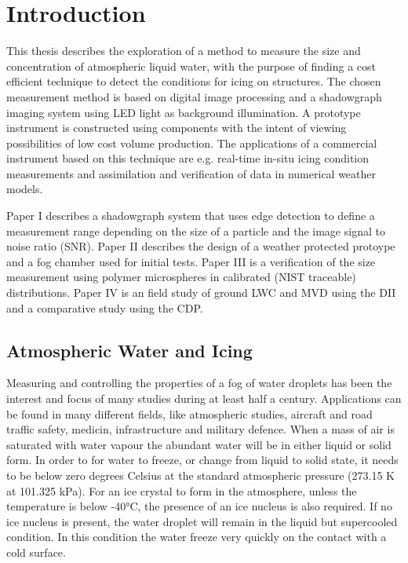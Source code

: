 

\chapter{Introduction}

This thesis describes the exploration of a method to measure the size and concentration of atmospheric liquid water, with the purpose of finding a cost efficient technique to detect the conditions for icing on structures. The chosen measurement method is based on digital image processing and a shadowgraph imaging system using LED light as background illumination. A prototype instrument is constructed using components with the intent of viewing possibilities of low cost volume production. The applications of a commercial instrument based on this technique are e.g. real-time in-situ icing condition measurements and assimilation and verification of data in numerical weather models. 

Paper I describes a shadowgraph system that uses edge detection to define a measurement range depending on the size of a particle and the image signal to noise ratio (SNR). Paper II describes the design of a weather protected protoype and a fog chamber used for initial tests. Paper III is a verification of the size measurement using polymer microspheres in calibrated (NIST traceable) distributions. Paper IV is an field study of ground LWC and MVD using the DII and a comparative study using the CDP.

\section{Atmospheric Water and Icing}

Measuring and controlling the properties of a fog of water droplets has been the interest and focus of many studies during at least half a century. Applications can be found in many different fields, like atmospheric studies, aircraft and road traffic safety, medicin, infrastructure and military defence. When a mass of air is saturated with water vapour the abundant water will be in either liquid or solid form. In order to for water to freeze, or change from liquid to solid state, it needs to be below zero degrees Celsius at the standard atmospheric pressure (273.15 K at 101.325 kPa). For an ice crystal to form in the atmosphere, unless the temperature is below -40°C, the presence of an ice nucleus is also required. If no ice nucleus is present, the water droplet will remain in the liquid but supercooled condition. In this condition the water freeze very quickly on the contact with a cold surface.

